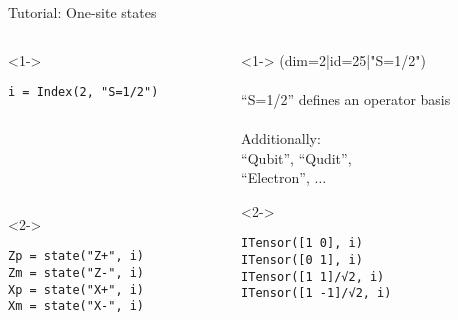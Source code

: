 \begin{frame}[fragile]{Tutorial: One-site states}

\begin{columns}

\begin{column}{4.5cm}

\begin{onlyenv}<1->
  \begin{lstlisting}[language=JuliaLocal, style=julia, basicstyle=\scriptsize\ttfamily]
  i = Index(2, "S=1/2")







  \end{lstlisting}
\end{onlyenv}

\begin{onlyenv}<2->
\begin{lstlisting}[language=JuliaLocal, style=julia, basicstyle=\scriptsize\ttfamily]
Zp = state("Z+", i)
Zm = state("Z-", i)
Xp = state("X+", i)
Xm = state("X-", i)
\end{lstlisting}
\end{onlyenv}

\end{column}

\begin{column}{5cm}

\begin{onlyenv}<1->
(dim=2|id=25|"S=1/2") \\
~\\
``S=1/2'' defines an operator basis \\
~\\
Additionally:\\
``Qubit'', ``Qudit'',\\
``Electron'', $\dots$
\end{onlyenv}

\begin{onlyenv}<2->
\vspace*{0.2cm}
~\\
\begin{lstlisting}[language=JuliaLocal, mathescape, style=julia, basicstyle=\scriptsize\ttfamily]
ITensor([1 0], i)
ITensor([0 1], i)
ITensor([1 1]/√2, i)
ITensor([1 -1]/√2, i)
\end{lstlisting}
\end{onlyenv}

\end{column}

\end{columns}

\end{frame}
